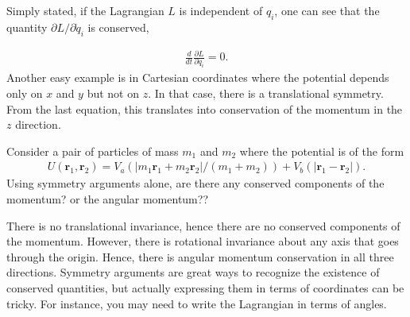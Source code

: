 \documentclass[letterpaper,10pt,english]{sphinxmanual}
\begin{document}
Simply stated, if the Lagrangian \(L\) is independent of \(q_i\), one can
see that the quantity \(\partial L/\partial\dot{q}_i\) is conserved,




\begin{equation*}
\begin{split}
\begin{equation}
\frac{d}{dt}\frac{\partial L}{\partial\dot{q}_i}=0.
\label{_auto104} \tag{140}
\end{equation}
\end{split}
\end{equation*}
Another easy example is in Cartesian coordinates where the potential
depends only on \(x\) and \(y\) but not on \(z\). In that case, there is a
translational symmetry. From the last equation, this translates
into conservation of the momentum in the \(z\) direction.

Consider a pair of particles of mass \(m_1\) and \(m_2\) where the potential is of the form
\begin{equation*}
\begin{split}
U(\boldsymbol{r}_1,\boldsymbol{r}_2)=V_a(|m_1\boldsymbol{r}_1+m_2\boldsymbol{r}_2|/(m_1+m_2))+V_b(|\boldsymbol{r}_1-\boldsymbol{r}_2|).
\end{split}
\end{equation*}
Using symmetry arguments alone, are there any conserved components of
the momentum? or the angular momentum??

There is no translational invariance, hence there are no conserved
components of the momentum. However, there is rotational invariance
about any axis that goes through the origin. Hence, there is angular
momentum conservation in all three directions. Symmetry arguments are
great ways to recognize the existence of conserved quantities, but
actually expressing them in terms of coordinates can be tricky. For
instance, you may need to write the Lagrangian in terms of angles.

















\renewcommand{\indexname}{Index}
\printindex
\end{document}
